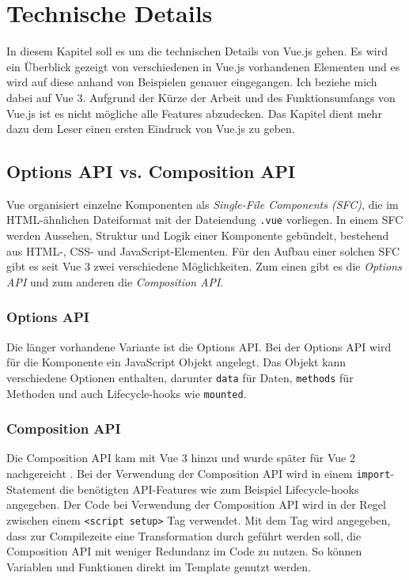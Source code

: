 

\chapter{Technische Details}\label{ch:technische-details}
In diesem Kapitel soll es um die technischen Details von Vue.js gehen.
Es wird ein Überblick gezeigt von verschiedenen in Vue.js vorhandenen Elementen
und es wird auf diese anhand von Beispielen genauer eingegangen.
Ich beziehe mich dabei auf Vue 3.
Aufgrund der Kürze der Arbeit und des Funktionsumfangs von Vue.js ist es nicht mögliche alle Features abzudecken.
Das Kapitel dient mehr dazu dem Leser einen ersten Eindruck von Vue.js zu geben.


\section{Options API vs. Composition API}\label{sec:options-api-and-composition-api}
Vue organisiert einzelne Komponenten als \emph{Single-File Components (SFC)},
die im HTML-ähnlichen Dateiformat mit der Dateiendung \lstinline{.vue} vorliegen.
In einem SFC werden Aussehen, Struktur und Logik einer Komponente gebündelt, bestehend aus HTML-, CSS- und JavaScript-Elementen.
Für den Aufbau einer solchen SFC gibt es seit Vue 3 zwei verschiedene Möglichkeiten.
Zum einen gibt es die \emph{Options API} und zum anderen die \emph{Composition API}. \cite{vueIntroduction}

\subsection*{Options API}
Die länger vorhandene Variante ist die Options API.
Bei der Options API wird für die Komponente ein JavaScript Objekt angelegt.
Das Objekt kann verschiedene Optionen enthalten, darunter \lstinline{data} für Daten, \lstinline{methods} für Methoden und auch Lifecycle-hooks wie \lstinline{mounted}.
\cite{vueIntroduction}

\subsection*{Composition API}
Die Composition API kam mit Vue 3 hinzu und wurde später für Vue 2 nachgereicht \cite{vueFAQ}.
Bei der Verwendung der Composition API wird in einem \lstinline{import}-Statement
die benötigten API-Features wie zum Beispiel Lifecycle-hooks angegeben.
Der Code bei Verwendung der Composition API wird in der Regel zwischen einem \lstinline{<script setup>} Tag verwendet.
Mit dem Tag wird angegeben, dass zur Compilezeite eine Transformation durch geführt werden soll,
die Composition API mit weniger Redundanz im Code zu nutzen.
So können Variablen und Funktionen direkt im Template genutzt werden.
\cite{vueIntroduction}

